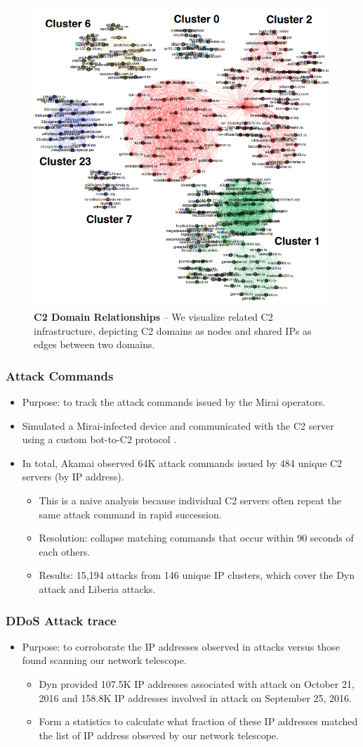 \documentclass{beamer}
\begin{document}
\begin{frame}
	\begin{figure}
		\includegraphics[width=50 mm, scale = 0.5]{C2DomainRelationship.png}
		\caption{ \textbf{C2 Domain Relationships} -- We visualize related C2 infrastructure, depicting C2 domains as nodes and shared IPs as edges between two domains.}
	\end{figure}
\end{frame}

\begin{frame}
	\frametitle{Attack Commands}
	\begin{itemize}
		\item Purpose: to track the attack commands issued by the Mirai operators.
		\item Simulated a Mirai-infected device and communicated with the C2 server using a custom bot-to-C2 protocol .
		\item In total, Akamai observed 64K attack commands issued by 484 unique C2 servers  (by IP address).
		\begin{itemize}
			\item This is a naive analysis because individual C2 servers often repeat the same attack command in rapid succession.
			\item Resolution: collapse matching commands that occur within 90 seconds of each others.
			\item Results: 15,194 attacks from 146 unique IP clusters, which cover the Dyn attack and Liberia attacks.
		\end{itemize}
	\end{itemize}
\end{frame}

\begin{frame}
	\frametitle{DDoS Attack trace}
	\begin{itemize}
		\item Purpose: to corroborate the IP addresses observed in attacks versus those found scanning our network telescope.
		\begin{itemize}
			\item Dyn provided 107.5K IP addresses associated
with attack on October 21, 2016 and 158.8K IP addresses involved in attack on September 25, 2016.
			\item Form a statistics to calculate what fraction of these IP addresses matched the list of IP address obseved by our network telescope.
		\end{itemize}
	\end{itemize}
\end{frame}
\end{document}

